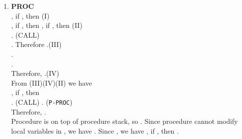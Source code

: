 \documentclass{llncs}
\begin{document}
{\begin{enumerate}[1.]
\item \textbf{PROC}\\
, if , then \hfill (I)\\
, if , then
, if , then
\hfill (II)\\
. (CALL)\\
. Therefore .\hfill (III)\\
.\\
.\\
Therefore, .\hfill (IV)\\
From (III)(IV)(II) we have\\
, if , then \\
. (CALL)\qquad
. (\texttt{P-PROC})\\
Therefore, .\\
Procedure  is on top of procedure stack, so
. Since procedure  cannot modify
local variables in , we have . Since , we have
, if , then .

\end{enumerate}

}
\end{document}
